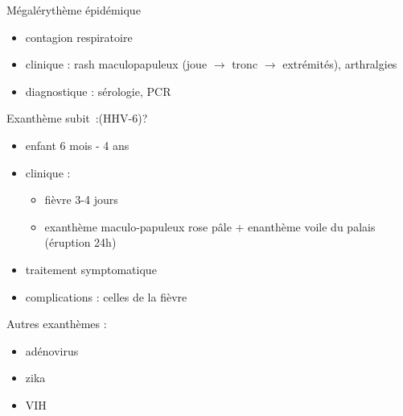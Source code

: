 \begin{figure}
\end{figure}


Mégalérythème épidémique

\begin{itemize}
\item
  contagion respiratoire
\item
  clinique : rash maculopapuleux (joue $\to$ tronc
  $\to$ extrémités), arthralgies
\item
  diagnostique : sérologie, PCR
\end{itemize}

Exanthème subit~:(HHV-6)?

\begin{itemize}
\item
  enfant 6 mois - 4 ans
\item
  clinique :

  \begin{itemize}
  \item
    fièvre 3-4 jours
  \item
    exanthème maculo-papuleux rose pâle + enanthème voile du palais
    (éruption 24h)
  \end{itemize}
\item
  traitement symptomatique
\item
  complications : celles de la fièvre
\end{itemize}

Autres exanthèmes :

\begin{itemize}
\item
  adénovirus
\item
  zika
\item
  VIH
\end{itemize}

